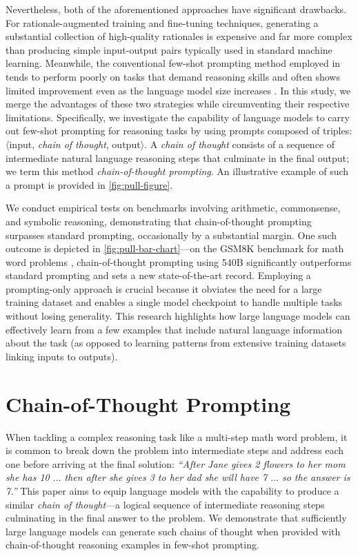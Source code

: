 Nevertheless, both of the aforementioned approaches have significant drawbacks. For rationale-augmented training and fine-tuning techniques, generating a substantial collection of high-quality rationales is expensive and far more complex than producing simple input-output pairs typically used in standard machine learning. Meanwhile, the conventional few-shot prompting method employed in \citet{brown2020language} tends to perform poorly on tasks that demand reasoning skills and often shows limited improvement even as the language model size increases \citep{rae2021scaling}. In this study, we merge the advantages of these two strategies while circumventing their respective limitations. Specifically, we investigate the capability of language models to carry out few-shot prompting for reasoning tasks by using prompts composed of triples: $\langle$input, \emph{chain of thought}, output$\rangle$. A \emph{chain of thought} consists of a sequence of intermediate natural language reasoning steps that culminate in the final output; we term this method \textit{chain-of-thought prompting}. An illustrative example of such a prompt is provided in \cref{fig:pull-figure}.

We conduct empirical tests on benchmarks involving arithmetic, commonsense, and symbolic reasoning, demonstrating that chain-of-thought prompting surpasses standard prompting, occasionally by a substantial margin. One such outcome is depicted in \cref{fig:pull-bar-chart}—on the GSM8K benchmark for math word problems \citep{cobbe2021training}, chain-of-thought prompting using \palm{} 540B significantly outperforms standard prompting and sets a new state-of-the-art record. Employing a prompting-only approach is crucial because it obviates the need for a large training dataset and enables a single model checkpoint to handle multiple tasks without losing generality. This research highlights how large language models can effectively learn from a few examples that include natural language information about the task (as opposed to learning patterns from extensive training datasets linking inputs to outputs).

\section{Chain-of-Thought Prompting} When tackling a complex reasoning task like a multi-step math word problem, it is common to break down the problem into intermediate steps and address each one before arriving at the final solution: \textit{``After Jane gives 2 flowers to her mom she has 10 $\ldots$ then after she gives 3 to her dad she will have 7 $\ldots$ so the answer is 7.''} This paper aims to equip language models with the capability to produce a similar \textit{chain of thought}—a logical sequence of intermediate reasoning steps culminating in the final answer to the problem. We demonstrate that sufficiently large language models can generate such chains of thought when provided with chain-of-thought reasoning examples in few-shot prompting.

